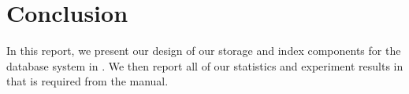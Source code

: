 \documentclass{article}
\begin{document}
	

	











\section{Conclusion}
In this report, we present our design of our storage and index components for the database system in . We then report all of our statistics and experiment results in  that is required from the manual.



\newpage
\appendix


\end{document}
